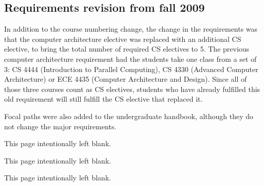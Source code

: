 \subsection{Requirements revision from fall 2009}

In addition to the course numbering change, the change in the
requirements was that the computer architecture elective was replaced
with an additional CS elective, to bring the total number of required
CS electives to 5. The previous computer architecture requirement had
the students take one class from a set of 3: CS 4444
(Introduction to Parallel Computing), CS 4330 (Advanced Computer
Architecture) or ECE 4435 (Computer Architecture and
Design). Since all of those three courses count as CS electives,
students who have already fulfilled this old requirement will still
fulfill the CS elective that replaced it.

Focal paths were also added to the undergraduate handbook, although
they do not change the major requirements.

\fi

\clearpage
\vspace*{3in}
\begin{center}
This page intentionally left blank.
\end{center}

\clearpage
\vspace*{3in}
\begin{center}
This page intentionally left blank.
\end{center}

\clearpage
\vspace*{3in}
\begin{center}
This page intentionally left blank.
\end{center}
